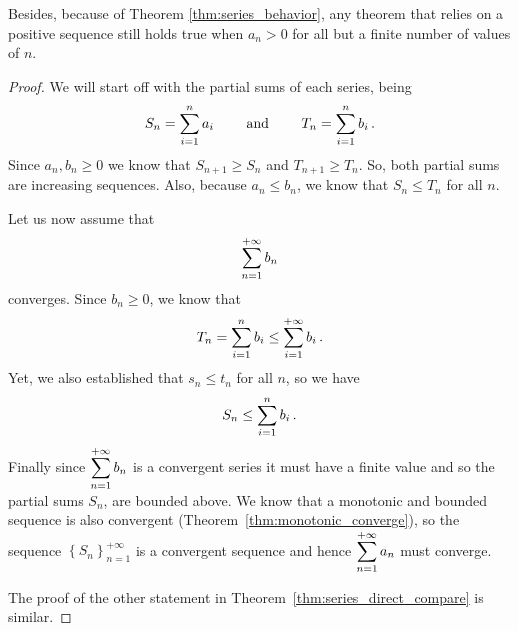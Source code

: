  Besides, because of Theorem \ref{thm:series_behavior}, any theorem that relies on a positive sequence still holds true when $a_n>0$ for all but a finite number of values of $n$.

\ifanalysis

\begin{proof}
We will start off with the partial sums of each series, being
$$
S_n=\displaystyle \sum_{i=1}^n a_i \qquad\text{ and }\qquad T_n=\displaystyle \sum_{i=1}^n b_i\,.
$$
Since $a_n,b_n\geq0$ we know that $S_{n+1}\geq S_n$ and $T_{n+1}\geq T_n$. So, both partial sums are increasing sequences. Also, because $a_n\leq b_n$, we know that $S_n\leq T_n$ for all $n$. 

Let us now assume that
$$\displaystyle \sum_{n=1}^{+\infty} b_n$$
converges. Since $b_n\geq0$, we know that
$$
T_n=\displaystyle \sum_{i=1}^n b_i\leq\displaystyle \sum_{i=1}^{+\infty} b_i\,.
$$
Yet, we also established that $s_n\leq t_n$ for all $n$, so we have
$$
S_n\leq\displaystyle \sum_{i=1}^n b_i\,.
$$
Finally since $\displaystyle \sum_{n=1}^{+\infty} b_n$ is a convergent series it must have a finite value and so the partial sums $S_n$, are bounded above. We know that a monotonic and bounded sequence is also convergent (Theorem~\ref{thm:monotonic_converge}), so the sequence  $\left\{S_n\right\}_{n=1}^{+\infty}$ is a convergent sequence  and hence $\displaystyle \sum_{n=1}^{+\infty} a_n$ must converge. 

The proof of the other statement in Theorem~\ref{thm:series_direct_compare} is similar.
\end{proof}

\fi


